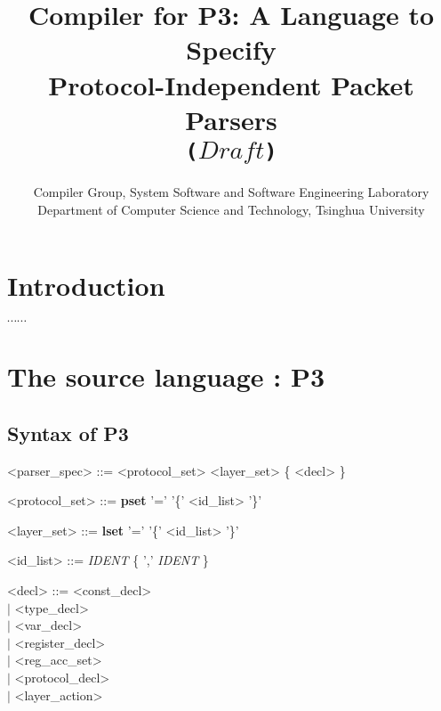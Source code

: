 \documentclass{article}
\title{\bf Compiler for P3: A Language to Specify \\ Protocol-Independent Packet Parsers \\ \tt ($Draft$)}
\author{ Compiler Group, System Software and Software Engineering Laboratory \\ Department of Computer Science and Technology, Tsinghua University }
\begin{document}
\maketitle

\section{Introduction}

$\cdots\cdots$

\section{The source language : P3}

\subsection{Syntax of P3}

\begin{grammar} \small

{\renewcommand\baselinestretch{0}\selectfont
<parser\_spec>   ::= <protocol\_set> <layer\_set> \{ <decl> \}

<protocol\_set>     ::=   \textbf{pset} '=' '\{' <id\_list> '\}'

<layer\_set>     ::=   \textbf{lset} '=' '\{' <id\_list> '\}'

<id\_list>     ::=   \emph{IDENT} \{ ',' \emph{IDENT} \}

<decl>     ::=   <const\_decl>  \\
     \hspace*{0.48cm} $\mid$  <type\_decl>  \\
     \hspace*{0.48cm} $\mid$  <var\_decl>  \\
     \hspace*{0.48cm} $\mid$  <register\_decl>  \\
     \hspace*{0.48cm} $\mid$  <reg\_acc\_set>  \\
     \hspace*{0.48cm} $\mid$  <protocol\_decl> \\
     \hspace*{0.48cm} $\mid$  <layer\_action>

\par}

\end{grammar}
\end{document}
